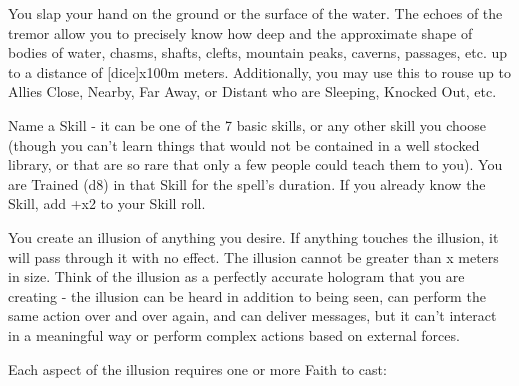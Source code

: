 {\MYSTERY [
  Name = Sound the Deeps,
  Link = arcana-mystery-sound-the-deeps,
  Paradigm = Force,
  Save = N,
  Duration = Instant,
  Target = Close Target(s)
]

You slap your hand on the ground or the surface of the water.  The echoes of the tremor allow you to precisely know how deep and the approximate shape of bodies of water, chasms, shafts, clefts, mountain peaks, caverns, passages, etc.  up to a distance of [dice]x100m meters.  Additionally, you may use this to rouse up to \DICE Allies Close, Nearby, Far Away, or Distant who are Sleeping, Knocked Out, etc. 

\newpage

\MYSTERY [
  Name = Expertise,
  Link = arcana-mystery-expertise,
  Paradigm = Mind,
  Save = N,
  Duration = \SUM Minutes,
  Target = Self
]

Name a Skill - it can be one of the 7 basic skills, or any other skill you choose (though you can't learn things that would not be contained in a well stocked library, or that are so rare that only a few people could teach them to you).  You are Trained (d8) in that Skill for the spell's duration.  If you already know the Skill, add +\DICE x2 to your Skill roll.

\MYSTERY [
  Name = Illusion,
  Link = arcana-mystery-illusion,
  Paradigm = Mind,
  Save = N,
  Duration = Varies,
  Target = See Below
]

You create an illusion of anything you desire. If anything touches the illusion, it will pass through it with no effect.  The illusion cannot be greater than \DICE x \DICE meters in size.  Think of the illusion as a perfectly accurate hologram that you are creating - the illusion can be heard in addition to being seen, can perform the same action over and over again, and can deliver messages, but it can't interact in a meaningful way or perform complex actions based on external forces. 

Each aspect of the illusion requires one or more Faith to cast:


}
